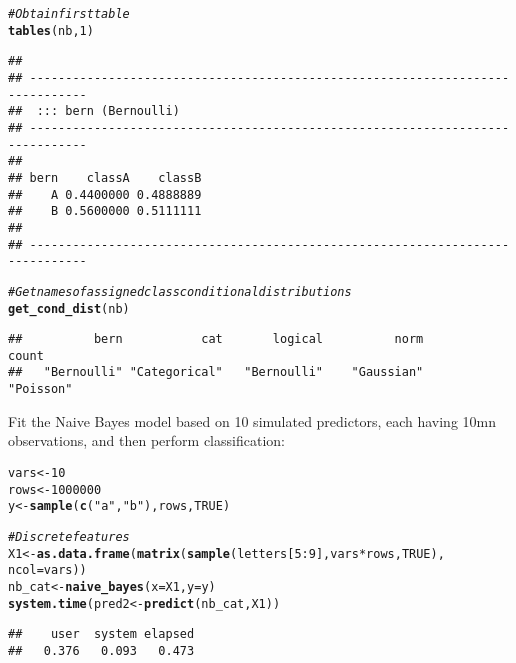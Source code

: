 \documentclass{article}\usepackage[]{graphicx}\usepackage[]{color}
\makeatletter
\newcommand{\hlnum}[1]{\textcolor[rgb]{0.686,0.059,0.569}{#1}}%
\newcommand{\hlstr}[1]{\textcolor[rgb]{0.192,0.494,0.8}{#1}}%
\newcommand{\hlcom}[1]{\textcolor[rgb]{0.678,0.584,0.686}{\textit{#1}}}%
\newcommand{\hlopt}[1]{\textcolor[rgb]{0,0,0}{#1}}%
\newcommand{\hlstd}[1]{\textcolor[rgb]{0.345,0.345,0.345}{#1}}%
\newcommand{\hlkwb}[1]{\textcolor[rgb]{0.69,0.353,0.396}{#1}}%
\newcommand{\hlkwc}[1]{\textcolor[rgb]{0.333,0.667,0.333}{#1}}%
\newcommand{\hlkwd}[1]{\textcolor[rgb]{0.737,0.353,0.396}{\textbf{#1}}}%
\newenvironment{kframe}{%
 \def\at@end@of@kframe{}%
 \ifinner\ifhmode%
  \def\at@end@of@kframe{\end{minipage}}%
  \begin{minipage}{\columnwidth}%
 \fi\fi%
 \def\FrameCommand##1{\hskip\@totalleftmargin \hskip-\fboxsep
 \colorbox{shadecolor}{##1}\hskip-\fboxsep
     \hskip-\linewidth \hskip-\@totalleftmargin \hskip\columnwidth}%
 \MakeFramed {\advance\hsize-\width
   \@totalleftmargin\z@ \linewidth\hsize
   \@setminipage}}%
 {\par\unskip\endMakeFramed%
 \at@end@of@kframe}
\newenvironment{knitrout}{}{} %
\makeatother
\begin{document}
\begin{knitrout}
\begin{kframe}
\begin{alltt}
\hlcom{# Obtain first table}
\hlkwd{tables}\hlstd{(nb,} \hlnum{1}\hlstd{)}
\end{alltt}
\begin{verbatim}
## 
## ------------------------------------------------------------------------------ 
##  ::: bern (Bernoulli) 
## ------------------------------------------------------------------------------ 
##     
## bern    classA    classB
##    A 0.4400000 0.4888889
##    B 0.5600000 0.5111111
## 
## ------------------------------------------------------------------------------
\end{verbatim}
\begin{alltt}
\hlcom{# Get names of assigned class conditional distributions}
\hlkwd{get_cond_dist}\hlstd{(nb)}
\end{alltt}
\begin{verbatim}
##          bern           cat       logical          norm         count 
##   "Bernoulli" "Categorical"   "Bernoulli"    "Gaussian"     "Poisson"
\end{verbatim}
\end{kframe}
\end{knitrout}

Fit the Naive Bayes model based on 10 simulated predictors, each having 10mn observations, and then perform classification:

\begin{knitrout}
\color{fgcolor}\begin{kframe}
\begin{alltt}
\hlstd{vars} \hlkwb{<-} \hlnum{10}
\hlstd{rows} \hlkwb{<-} \hlnum{1000000}
\hlstd{y} \hlkwb{<-} \hlkwd{sample}\hlstd{(}\hlkwd{c}\hlstd{(}\hlstr{"a"}\hlstd{,} \hlstr{"b"}\hlstd{), rows,} \hlnum{TRUE}\hlstd{)}

\hlcom{# Discrete features}
\hlstd{X1} \hlkwb{<-} \hlkwd{as.data.frame}\hlstd{(}\hlkwd{matrix}\hlstd{(}\hlkwd{sample}\hlstd{(letters[}\hlnum{5}\hlopt{:}\hlnum{9}\hlstd{], vars} \hlopt{*} \hlstd{rows,} \hlnum{TRUE}\hlstd{),}
                           \hlkwc{ncol} \hlstd{= vars))}
\hlstd{nb_cat} \hlkwb{<-} \hlkwd{naive_bayes}\hlstd{(}\hlkwc{x} \hlstd{= X1,} \hlkwc{y} \hlstd{= y)}
\hlkwd{system.time}\hlstd{(pred2} \hlkwb{<-} \hlkwd{predict}\hlstd{(nb_cat, X1))}
\end{alltt}
\begin{verbatim}
##    user  system elapsed 
##   0.376   0.093   0.473
\end{verbatim}
\end{kframe}
\end{knitrout}
\end{document}
